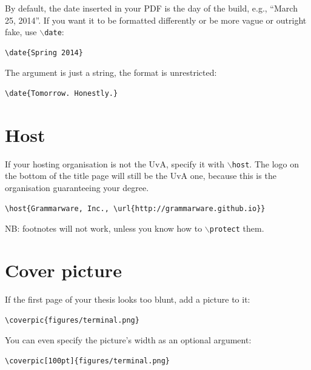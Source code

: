 \documentclass{uvamscse}
\newcommand{\cmd}[1]{\texttt{$\backslash$#1}}
\begin{document}
By default, the date inserted in your PDF is the day of the build, e.g., ``March 25, 2014''. If you want it to be formatted differently or be more vague or outright fake, use \cmd{date}:

\begin{snippet}
\begin{verbatim}
\date{Spring 2014}
\end{verbatim}
\end{snippet}

The argument is just a string, the format is unrestricted:

\begin{snippet}
\begin{verbatim}
\date{Tomorrow. Honestly.}
\end{verbatim}
\end{snippet}

\section{Host}

If your hosting organisation is not the UvA, specify it with \cmd{host}. The
logo on the bottom of the title page will still be the UvA one, because this
is the organisation guaranteeing your degree.

\begin{snippet}
\begin{verbatim}
\host{Grammarware, Inc., \url{http://grammarware.github.io}}
\end{verbatim}
\end{snippet}

NB: footnotes will not work, unless you know how to \cmd{protect} them.

\section{Cover picture}

If the first page of your thesis looks too blunt, add a picture to it:

\begin{snippet}
\begin{verbatim}
\coverpic{figures/terminal.png}
\end{verbatim}
\end{snippet}

You can even specify the picture's width as an optional argument:

\begin{snippet}
\begin{verbatim}
\coverpic[100pt]{figures/terminal.png}
\end{verbatim}
\end{snippet}
\end{document}
